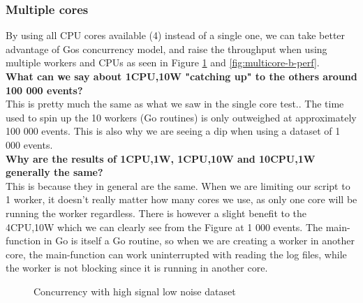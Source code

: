 \subsubsection{Multiple cores}

By using all CPU cores available (4) instead of a single one, we can take better advantage of Gos concurrency model, and raise the throughput when using multiple workers and CPUs as seen in Figure \cref{fig:multicore-hsln-perf} and \cref{fig:multicore-b-perf}.\\
\textbf{What can we say about 1CPU,10W "catching up" to the others around 100 000 events?}\\
This is pretty much the same as what we saw in the single core test.. The time used to spin up the 10 workers (Go routines) is only outweighed at approximately 100 000 events. This is also why we are seeing a dip when using a dataset of 1 000 events.\\
\textbf{Why are the results of 1CPU,1W, 1CPU,10W and 10CPU,1W generally the same?}\\
This is because they in general are the same. When we are limiting our script to 1 worker, it doesn't really matter how many cores we use, as only one core will be running the worker regardless. There is however a slight benefit to the 4CPU,10W which we can clearly see from the Figure at 1 000 events. The main-function in Go is itself a Go routine, so when we are creating a worker in another core, the main-function can work uninterrupted with reading the log files, while the worker is not blocking since it is running in another core.

\begin{figure}[ht]
\centering
\pgfplotsset{scaled y ticks=false}
\caption{Concurrency with high signal low noise dataset}
\label{fig:multicore-hsln-perf}
\end{figure}

